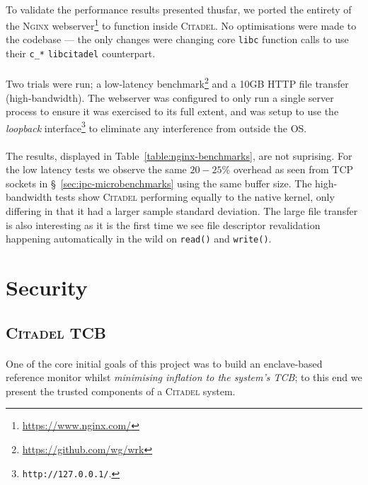 \paragraph{} To validate the performance results presented thusfar, we ported the entirety of the \textsc{Nginx} webserver\footnote{\url{https://www.nginx.com/}} to function inside \textsc{Citadel}. No optimisations were made to the codebase --- the only changes were changing core \texttt{libc} function calls to use their \texttt{c\_*} \texttt{libcitadel} counterpart.

\paragraph{} Two trials were run; a low-latency benchmark\footnote{\url{https://github.com/wg/wrk}} and a 10GB HTTP file transfer (high-bandwidth). The webserver was configured to only run a single server process to ensure it was exercised to its full extent, and was setup to use the \textit{loopback} interface\footnote{\texttt{http://127.0.0.1/}.} to eliminate any interference from outside the OS. 

\paragraph{} The results, displayed in Table~\ref{table:nginx-benchmarks}, are not suprising. For the low latency tests we observe the same $20-25$\% overhead as seen from TCP sockets in §~\ref{sec:ipc-microbenchmarks} using the same buffer size. The high-bandwidth tests show \textsc{Citadel} performing equally to the native kernel, only differing in that it had a larger sample standard deviation. The large file transfer is also interesting as it is the first time we see file descriptor revalidation happening automatically in the wild on \texttt{read()} and \texttt{write()}. 





\section{Security}

\subsection{\textsc{Citadel} TCB}

\paragraph{} One of the core initial goals of this project was to build an enclave-based reference monitor whilst \textit{minimising inflation to the system's TCB}; to this end we present the trusted components of a \textsc{Citadel} system.

